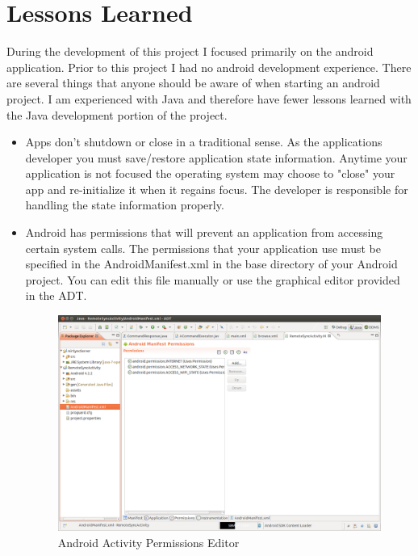 \documentclass[12pt]{article}
\begin{document}
\section{Lessons Learned}

During the development of this project I focused primarily on the android application. Prior to this project I had no android development experience. There are several things that anyone should be aware of when starting an android project.  I am experienced with Java and therefore have fewer lessons learned with the Java development portion of the project.

\begin{itemize}
\item Apps don't shutdown or close in a traditional sense. As the applications developer you must save/restore application state information. Anytime your application is not focused the operating system may choose to "close" your app and re-initialize it when it regains focus. The developer is responsible for handling the state information properly.

\item Android has permissions that will prevent an application from accessing certain system calls. The permissions that your application use must be specified in the AndroidManifest.xml in the base directory of your Android project. You can edit this file manually or use the graphical editor provided in the ADT.
\begin{figure}[h]
\includegraphics[width=1\textwidth]{permissions.png}
\caption{Android Activity Permissions Editor}
\end{figure}


\end{itemize}
\end{document}
